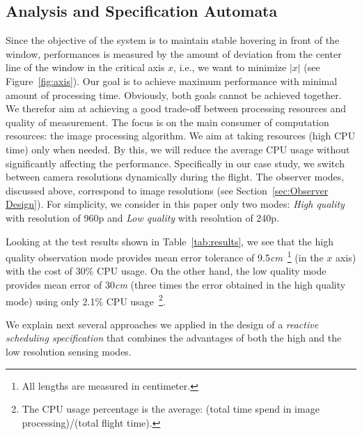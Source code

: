 \documentclass{sig-alternate-ipsn13}
\begin{document}
\subsection{Analysis and Specification Automata}
\label{sec:Analysis}

Since the objective of the system is to maintain stable hovering in front of the window, performances is measured by the amount of deviation from the center line of the window in the critical axis $x$, i.e., we want to minimize $\left| x \right|$ (see Figure~\ref{fig:axis}). Our goal is to achieve maximum performance with minimal amount of processing time. Obviously, both goals cannot be achieved together. We therefor aim at achieving a good trade-off between processing resources and quality of measurement. The focus is on the main consumer of computation resources: the image processing algorithm.
We aim at taking resources (high CPU time) only when needed. By this, we will reduce the average CPU usage without significantly affecting the performance.
Specifically in our case study, we switch between camera resolutions dynamically during the flight. The observer modes, discussed above, correspond to image resolutions (see Section~\ref{sec:Observer Design}).
For simplicity, we consider in this paper only two modes: \textit{High quality} with resolution of 960p and \textit{Low quality} with resolution of 240p.

Looking at the test results shown in Table~\ref{tab:results}, we see that the high quality observation mode provides mean error tolerance of 9.5\textit{cm}~\footnote{All lengths are measured in centimeter.}  (in the $x$ axis) with the cost of 30\% CPU usage.
On the other hand, the low quality mode provides mean error of 30\textit{cm} (three times the error obtained in the high quality mode) using only 2.1\% CPU usage~\footnote{The CPU usage percentage is the average: (total time spend in image processing)/(total flight time). }.

We explain next several approaches we applied in the design of a \textit{reactive scheduling specification} that combines the advantages of both the high and the low resolution sensing modes.
\end{document}
